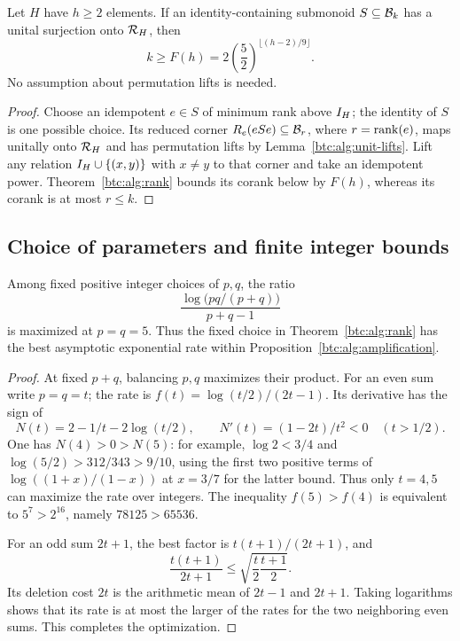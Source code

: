 \begin{theorem}\label{btc:alg:divisor}
Let $H$ have $h\ge2$ elements. If an identity-containing submonoid
$S\subseteq\mathcal{B}_{k}$ has a unital surjection onto $\mathcal{R}_{H}$, then
\begin{equation}\label{btc:alg:divisor-bound}
 k\ge F(h)=2\left(\frac52\right)^{\lfloor(h-2)/9\rfloor}.
\end{equation}
No assumption about permutation lifts is needed.
\end{theorem}

\begin{proof}
Choose an idempotent $e\in S$ of minimum rank above $I_H$;
the identity of $S$ is one possible choice. Its reduced corner
$R_e(eSe)\subseteq\mathcal{B}_{r}$, where $r=\operatorname{rank}(e)$, maps unitally onto
$\mathcal{R}_{H}$ and has permutation lifts by Lemma~\ref{btc:alg:unit-lifts}.
Lift any relation $I_H\cup\{(x,y)\}$ with $x\ne y$ to that
corner and take an idempotent power. Theorem~\ref{btc:alg:rank} bounds
its corank below by $F(h)$, whereas its corank is at most $r\le k$.
\end{proof}

\subsection{Choice of parameters and finite integer bounds}
\label{btc:alg:optimization-section}

\begin{proposition}
\label{btc:alg:optimal-parameters}
Among fixed positive integer choices of $p,q$, the ratio
\begin{equation}\label{btc:alg:rate}
 \frac{\log\bigl(pq/(p+q)\bigr)}{p+q-1}
\end{equation}
is maximized at $p=q=5$. Thus the fixed choice in
Theorem~\ref{btc:alg:rank} has the best asymptotic exponential rate
within Proposition~\ref{btc:alg:amplification}.
\end{proposition}

\begin{proof}
At fixed $p+q$, balancing $p,q$ maximizes their product. For an even
sum write $p=q=t$; the rate is
$f(t)=\log(t/2)/(2t-1)$. Its derivative has the sign of
\[
 N(t)=2-1/t-2\log(t/2),\qquad
 N'(t)=(1-2t)/t^2<0\quad(t>1/2).
\]
One has $N(4)>0>N(5)$: for example, $\log 2<3/4$ and
$\log(5/2)>312/343>9/10$, using the first two positive terms of
$\log((1+x)/(1-x))$ at $x=3/7$ for the latter bound.
Thus only $t=4,5$ can maximize the rate
over integers. The inequality $f(5)>f(4)$ is equivalent to
$5^7>2^{16}$, namely $78125>65536$.

For an odd sum $2t+1$, the best factor is $t(t+1)/(2t+1)$, and
\[
 \frac{t(t+1)}{2t+1}
 \le\sqrt{\frac t2\frac{t+1}{2}}.
\]
Its deletion cost $2t$ is the arithmetic mean of $2t-1$ and
$2t+1$. Taking logarithms shows that its rate is at most the
larger of the rates for the two neighboring even sums. This
completes the optimization.
\end{proof}

